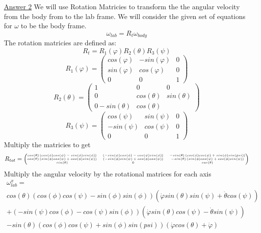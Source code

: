 \documentclass[12pt]{article}
\begin{document}
    \underline{Answer 2}
    We will use Rotation Matricies to transform the the angular velocity from the body from to the lab frame. We will consider the given set of equations for $\omega$ to be the body frame.
    \[
        \omega_{lab} = R_t \omega_{body}
    \]
    The rotation matricies are defined as:
    \[
        R_t = R_1(\varphi) R_2(\theta) R_3(\psi)
    \]
    \[
        R_1(\varphi) =
        \begin{pmatrix}
            cos(\varphi) & -sin(\varphi) & 0
            \\ sin(\varphi) & cos(\varphi) & 0
            \\ 0 & 0 & 1
        \end{pmatrix}
    \]
    \[
        R_2(\theta) =
        \begin{pmatrix}
            1 & 0 & 0
            \\ 0 & cos(\theta) & sin(\theta)
            \\ 0 -sin(\theta) & cos(\theta)
        \end{pmatrix}
    \]
    \[
        R_3(\psi) =
        \begin{pmatrix}
            cos(\psi) & sin(\psi) & 0
            \\ -sin(\psi) & cos(\psi) & 0
            \\ 0 & 0 & 1
        \end{pmatrix}
    \]
    Multiply  the matricies to get
    \[{\tiny
        R_{tot} =
        \begin{pmatrix}
            cos(\theta) \left(cos(\phi) cos(\psi) - sin(\phi) sin(\phi)\right)
            &
            \left( -sin(\psi)cos(\phi) - cos(\psi) sin(\phi) \right)
            & 
            -sin(\theta) \left(cos(\phi) cos(\psi) + sin(\phi) sin(psi) \right)
            \\
            cos(\theta) \left(sin(\phi) cos(\psi) + cos(\phi) sin(\psi) \right)
            & 
            \left( -sin(\phi) sin(\psi) + cos(\phi)cos(\psi) \right)
            & 
            -sin(\theta) \left( sin(\phi) cos(\psi) + cos(\phi) sin(\psi) \right)
            \\
            sin(\theta)
            &
            0
            &
            cos(\theta)
        \end{pmatrix}
        }
    \]
    Multiply the angular velocity by the rotational matrices for each axis
    \[
        \begin{split}
            \omega_{lab}^x =
            \\
            cos(\theta) \left(cos(\phi) cos(\psi) - sin(\phi) sin(\phi)\right) \left(\dot{\varphi} sin(\theta) sin(\psi) + \dot{\theta} cos(\psi) \right) 
            \\
            + \left( -sin(\psi)cos(\phi) - cos(\psi) sin(\phi) \right) \left(\dot{\varphi} sin(\theta) cos(\psi) - \dot{\theta} sin(\psi) \right)
            \\
            - sin(\theta) \left(cos(\phi) cos(\psi) + sin(\phi) sin(psi) \right) \left(\dot{\varphi} cos(\theta) + \dot{\varphi} \right)
        \end{split}
    \]
\end{document}
